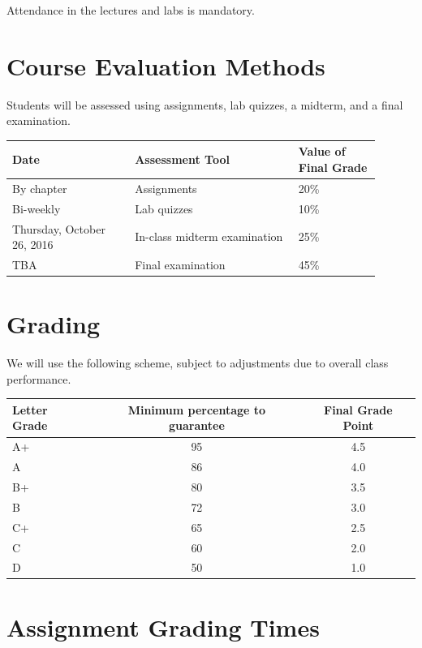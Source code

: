 \documentclass[12pt]{article}
\begin{document}
Attendance in the lectures and labs is mandatory.

\section{Course Evaluation Methods}

Students will be assessed using assignments, lab quizzes, a midterm, and a final examination.

\begin{center}
\begin{tabular}[t]{p{0.3\linewidth}p{0.4\linewidth}p{0.2\linewidth}}
\toprule
\mbox{}\newline \textbf{Date} &	\mbox{}\newline\textbf{Assessment Tool}	& \textbf{Value of \newline Final Grade} \\
\midrule
By chapter & Assignments & 20\% \\
Bi-weekly & Lab quizzes & 10\% \\
Thursday, October 26, 2016 & In-class midterm examination & 25\% \\
TBA & Final examination & 45\% \\
\bottomrule
\end{tabular}
\end{center}

\section{Grading}

We will use the following scheme, subject to adjustments due to overall class performance.

\begin{center}
\begin{tabular}[t]{lcc}
\toprule
Letter Grade & Minimum percentage to guarantee & Final Grade Point  \\
\midrule
A+ & 95 & 4.5 \\
A & 86 & 4.0 \\
B+ & 80& 3.5 \\
B & 72 &  3.0 \\
C+ & 65  & 2.5 \\
C & 60 & 2.0 \\
D & 50& 1.0  \\
\bottomrule
\end{tabular}
\end{center}

\section{Assignment Grading Times}
\end{document}
